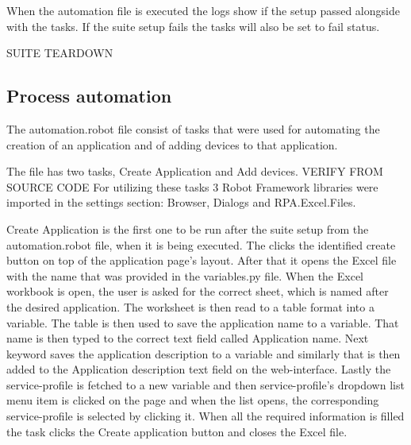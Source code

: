 When the automation file is executed the logs show if the setup passed alongside with the tasks.
If the suite setup fails the tasks will also be set to fail status.

SUITE TEARDOWN

\subsection{Process automation}
The automation.robot file consist of tasks that were used for automating the creation of an application and of adding devices to that application.

The file has two tasks, Create Application and Add devices. VERIFY FROM SOURCE CODE
For utilizing these tasks 3 Robot Framework libraries were imported in the settings section: Browser, Dialogs and RPA.Excel.Files.

Create Application  is the first one to be run after the suite setup from the automation.robot file, when it is being executed.
The  clicks the identified create button on top of the application page's layout.
After that it opens the Excel file with the name that was provided in the variables.py file.
When the Excel workbook is open, the user is asked for the correct sheet, which is named after the desired application. 
The worksheet is then read to a table format into a variable.
The table is then used to save the application name to a variable.
That name is then typed to the correct text field called Application name.
Next keyword saves the application description to a variable and similarly that is then added to the Application description text field on the web-interface.
Lastly the service-profile is fetched to a new variable and then service-profile's dropdown list menu item is clicked on the page and when the list opens, the corresponding service-profile is selected by clicking it.
When all the required information is filled the task clicks the Create application button and closes the Excel file.

